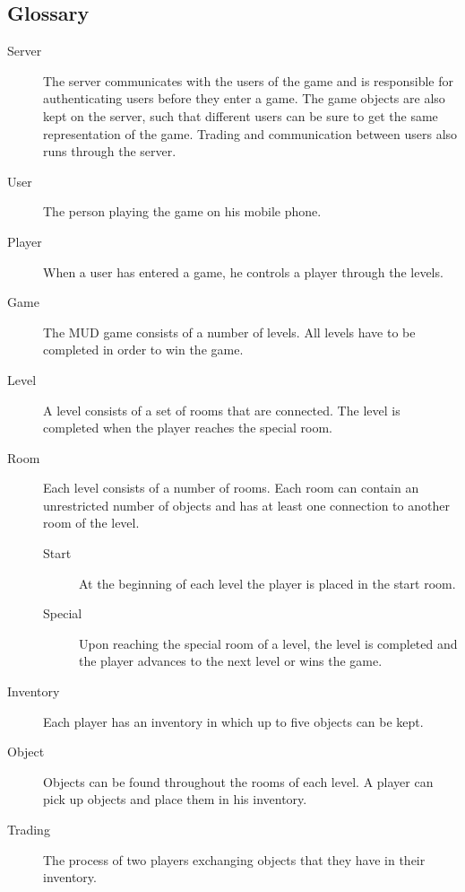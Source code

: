 \subsection{Glossary}
\begin{description}
	\item[Server] The server communicates with the users of the game and is responsible for authenticating users before they enter a game. The game objects are also kept on the server, such that different users can be sure to get the same representation of the game. Trading and communication between users also runs through the server.
	
	\item[User] The person playing the game on his mobile phone.
	
	\item[Player] When a user has entered a game, he controls a player through the levels.
	
	\item[Game] The MUD game consists of a number of levels. All levels have to be completed in order to win the game.
	
	\item[Level] A level consists of a set of rooms that are connected. The level is completed when the player reaches the special room.
	
	\item[Room] Each level consists of a number of rooms. Each room can contain an unrestricted number of objects and has at least one connection to another room of the level.
		\begin{description}
			\item[Start] At the beginning of each level the player is placed in the start room.
			
			\item[Special] Upon reaching the special room of a level, the level is completed and the player advances to the next level or wins the game.

		\end{description}
	
	\item[Inventory] Each player has an inventory in which up to five objects can be kept.
	
	\item[Object] Objects can be found throughout the rooms of each level. A player can pick up objects and place them in his inventory.
	
	\item[Trading] The process of two players exchanging objects that they have in their inventory.

\end{description}